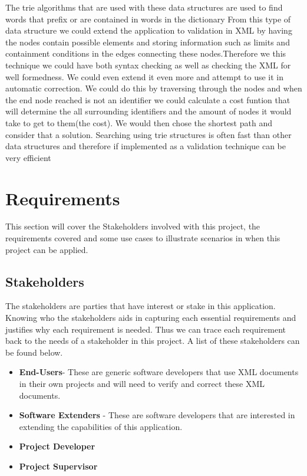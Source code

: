 \documentclass{report}
\begin{document}
The trie algorithms that are used with these data structures are used to find words that prefix or are contained in words in the dictionary
From this type of data structure we could extend the application to validation in XML by having the nodes contain possible elements and storing information such as limits and containment conditions in the edges connecting these nodes.Therefore we this technique we could have both syntax checking as well as checking the XML for well formedness. We could even extend it even more and attempt to use it in automatic correction. We could do this by traversing through the nodes and when the end node reached is not an identifier we could calculate a cost funtion that will determine the all surrounding identifiers and the amount of nodes it would take to get to them(the cost). We would then chose the shortest path and consider that a solution.  
Searching using trie structures is often fast than other data structures and therefore if implemented as a validation technique can be very efficient

\chapter{Requirements}
This section will cover the Stakeholders involved with this project, the requirements covered and some use cases to illustrate scenarios in when this project can be applied.

\section{Stakeholders}
The stakeholders are parties that have interest or stake in this application. Knowing who the stakeholders aids in capturing each essential requirements and justifies why each requirement is needed. Thus we can trace each requirement back to the needs of a stakeholder in this project. A list of these stakeholders can be found below.

\begin{itemize}
\item \textbf{End-Users}- These are generic software developers that use XML documents in their own projects and will need to verify and correct these XML documents.
\item \textbf{Software Extenders} -  These are software developers that are interested in extending the capabilities of this application.
\item \textbf{Project Developer}
\item \textbf{Project Supervisor}
\end{itemize}
\end{document}
